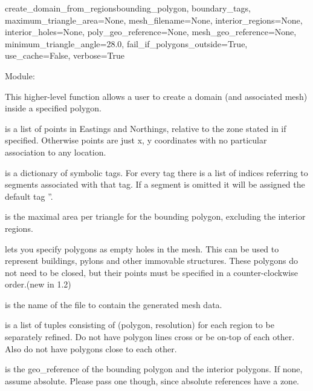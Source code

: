 \documentclass{manual}
\begin{document}
\begin{funcdesc}{create_domain_from_regions}{bounding_polygon,
                                             boundary_tags,
                                             maximum_triangle_area=None,
                                             mesh_filename=None,
                                             interior_regions=None,
                                             interior_holes=None,
                                             poly_geo_reference=None,
                                             mesh_geo_reference=None,
                                             minimum_triangle_angle=28.0,
                                             fail_if_polygons_outside=True,
                                             use_cache=False,
                                             verbose=True}

Module: 

This higher-level function allows a user to create a domain (and associated mesh)
inside a specified polygon.

 is a list of points in Eastings and Northings,
relative to the zone stated in  if specified.
Otherwise points are just x, y coordinates with no particular
association to any location.

 is a dictionary of symbolic tags. For every tag there
is a list of indices referring to segments associated with that tag.
If a segment is omitted it will be assigned the default tag ''.

 is the maximal area per triangle
for the bounding polygon, excluding the interior regions.

 lets you specify polygons as empty holes in the mesh.
This can be used  to represent buildings, pylons and other immovable
structures. These polygons do not need to be closed, but their points must be
specified in a counter-clockwise order.(new in 1.2)

 is the name of the file to contain the generated
mesh data.

 is a list of tuples consisting of (polygon,
resolution) for each region to be separately refined. Do not have
polygon lines cross or be on-top of each other.  Also do not have
polygons close to each other.

 is the geo_reference of the bounding polygon and
the interior polygons.
If none, assume absolute.  Please pass one though, since absolute
references have a zone.


\end{funcdesc}
\end{document}
